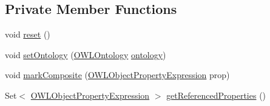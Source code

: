 \subsection*{Private Member Functions}
\begin{DoxyCompactItemize}
\item 
void \hyperlink{classorg_1_1semanticweb_1_1owlapi_1_1util_1_1_o_w_l_object_property_manager_a2d1ca7922c727c1d7ab9d50631701543}{reset} ()
\item 
void \hyperlink{classorg_1_1semanticweb_1_1owlapi_1_1util_1_1_o_w_l_object_property_manager_ab48d0fa588191c1d0e21bf6cd96099fb}{set\-Ontology} (\hyperlink{interfaceorg_1_1semanticweb_1_1owlapi_1_1model_1_1_o_w_l_ontology}{O\-W\-L\-Ontology} \hyperlink{classorg_1_1semanticweb_1_1owlapi_1_1util_1_1_o_w_l_object_property_manager_aaa59458294336629d79a6d74df9f0be7}{ontology})
\item 
void \hyperlink{classorg_1_1semanticweb_1_1owlapi_1_1util_1_1_o_w_l_object_property_manager_a9faf995e07dcc7b0366d44971b99a3fc}{mark\-Composite} (\hyperlink{interfaceorg_1_1semanticweb_1_1owlapi_1_1model_1_1_o_w_l_object_property_expression}{O\-W\-L\-Object\-Property\-Expression} prop)
\item 
Set$<$ \hyperlink{interfaceorg_1_1semanticweb_1_1owlapi_1_1model_1_1_o_w_l_object_property_expression}{O\-W\-L\-Object\-Property\-Expression} $>$ \hyperlink{classorg_1_1semanticweb_1_1owlapi_1_1util_1_1_o_w_l_object_property_manager_a097db6a653df1278d9e81452566547ac}{get\-Referenced\-Properties} ()
\end{DoxyCompactItemize}
